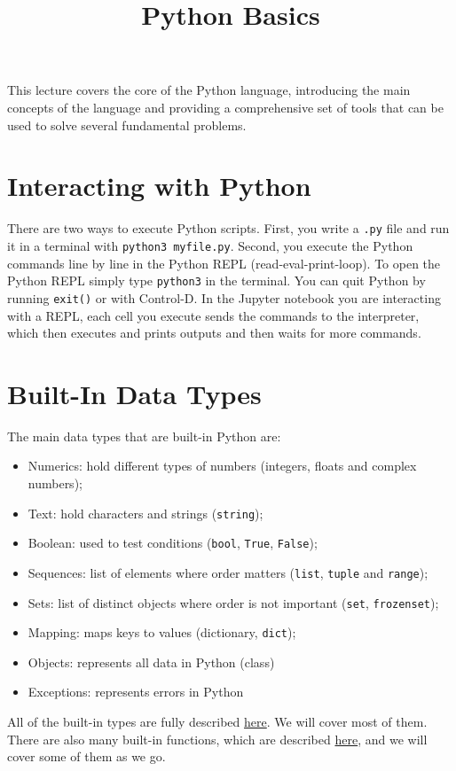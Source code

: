 \documentclass[12pt, a4paper]{article}
\date{}
\title{Python Basics}
\begin{document}
\maketitle
This lecture covers the core of the Python language, introducing the main concepts of the language and providing a comprehensive set of tools that can be used to solve several fundamental problems.
\section{Interacting with Python}
\label{sec:orgdf13d90}
There are two ways to execute Python scripts.
First, you write a \texttt{.py} file and run it in a terminal with \texttt{python3 myfile.py}.
Second, you execute the Python commands line by line in the Python REPL (read-eval-print-loop).
To open the Python REPL simply type \texttt{python3} in the terminal. You can quit Python by running \texttt{exit()} or with Control-D.
In the Jupyter notebook you are interacting with a REPL, each cell you execute sends the commands to the interpreter, which then executes and prints outputs and then waits for more commands.
\section{Built-In Data Types}
\label{sec:orga5f8216}
The main data types that are built-in Python are:
\begin{itemize}
\item Numerics: hold different types of numbers (integers, floats and complex numbers);
\item Text: hold characters and strings (\texttt{string});
\item Boolean: used to test conditions (\texttt{bool}, \texttt{True}, \texttt{False});
\item Sequences: list of elements where order matters (\texttt{list}, \texttt{tuple} and \texttt{range});
\item Sets: list of distinct objects where order is not important (\texttt{set}, \texttt{frozenset});
\item Mapping: maps keys to values (dictionary, \texttt{dict});
\item Objects: represents all data in Python (class)
\item Exceptions: represents errors in Python
\end{itemize}
All of the built-in types are fully described \href{https://docs.python.org/3.6/library/stdtypes.html}{here}. We will cover most of them. There are also many built-in functions, which are described \href{https://docs.python.org/3.6/library/functions.html}{here}, and we will cover some of them as we go.
\end{document}
